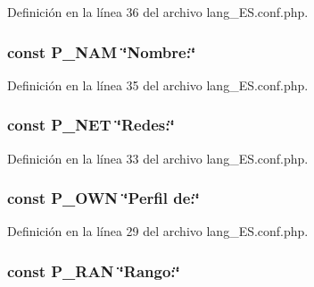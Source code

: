 Definición en la línea 36 del archivo lang\-\_\-\-E\-S.\-conf.\-php.

\hypertarget{lang__ES_8conf_8php_a298d6af9ed729c17543a14644e5be675}{
\subsubsection[{P\-\_\-\-N\-A\-M}]{\setlength{\rightskip}{0pt plus 5cm}const P\-\_\-\-N\-A\-M \char`\"{}Nombre\-:\char`\"{}}}\label{lang__ES_8conf_8php_a298d6af9ed729c17543a14644e5be675}


Definición en la línea 35 del archivo lang\-\_\-\-E\-S.\-conf.\-php.

\hypertarget{lang__ES_8conf_8php_a7b08d18ad2a5adbaae77bea17fd408bf}{
\subsubsection[{P\-\_\-\-N\-E\-T}]{\setlength{\rightskip}{0pt plus 5cm}const P\-\_\-\-N\-E\-T \char`\"{}Redes\-:\char`\"{}}}\label{lang__ES_8conf_8php_a7b08d18ad2a5adbaae77bea17fd408bf}


Definición en la línea 33 del archivo lang\-\_\-\-E\-S.\-conf.\-php.

\hypertarget{lang__ES_8conf_8php_ac1d527ffba12018124c595f2ad74c851}{
\subsubsection[{P\-\_\-\-O\-W\-N}]{\setlength{\rightskip}{0pt plus 5cm}const P\-\_\-\-O\-W\-N \char`\"{}Perfil de\-:\char`\"{}}}\label{lang__ES_8conf_8php_ac1d527ffba12018124c595f2ad74c851}


Definición en la línea 29 del archivo lang\-\_\-\-E\-S.\-conf.\-php.

\hypertarget{lang__ES_8conf_8php_a5fca0022c5481060364d39a3812ac604}{
\subsubsection[{P\-\_\-\-R\-A\-N}]{\setlength{\rightskip}{0pt plus 5cm}const P\-\_\-\-R\-A\-N \char`\"{}Rango\-:\char`\"{}}}\label{lang__ES_8conf_8php_a5fca0022c5481060364d39a3812ac604}



